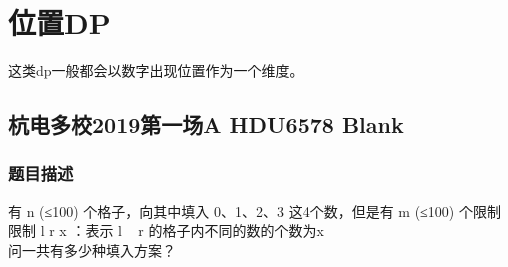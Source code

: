 \section{位置DP}
这类dp一般都会以数字出现位置作为一个维度。

\subsection{杭电多校2019第一场A HDU6578 Blank}
    \subsubsection{题目描述}
        有 n (≤100) 个格子，向其中填入 0、1、2、3 这4个数，但是有 m (≤100) 个限制\\
        限制 l r x ：表示 l ~ r 的格子内不同的数的个数为x\\        
        问一共有多少种填入方案？
